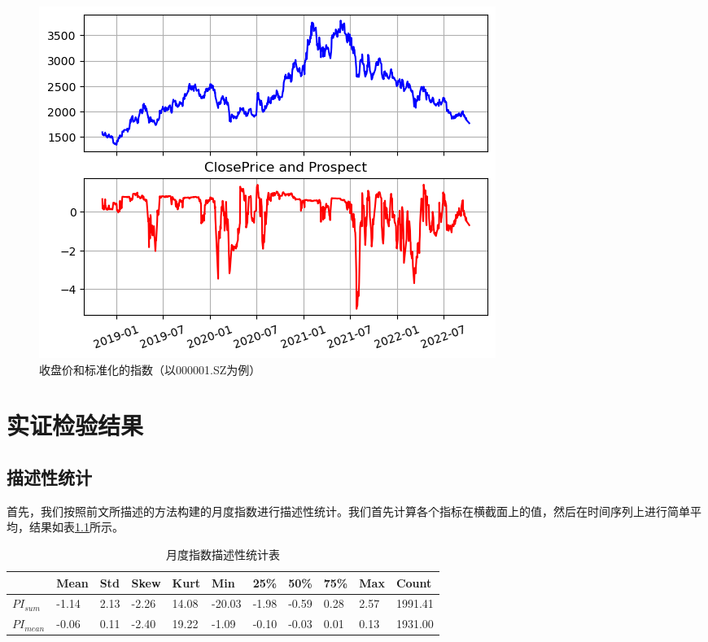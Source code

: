 \documentclass[a4paper,12pt]{report}
\begin{document}
\begin{figure}[htbp]
	\centering
	\includegraphics{figure/prospect_index_000001}
	\caption{收盘价和标准化的指数（以000001.SZ为例）}
	\label{fig:prospect_index_000001}
\end{figure}

\chapter{实证检验结果}
\section{描述性统计}
首先，我们按照前文所描述的方法构建的月度指数进行描述性统计。我们首先计算各个指标在横截面上的值，然后在时间序列上进行简单平均，结果如表\ref{tab: describe}所示。

\begin{table}[htbp]
	\centering
	\caption{月度指数描述性统计表}
	\label{tab: describe}
	\begin{tabular}{@{}lllllllllll@{}}
		\toprule
								 & Mean  & Std  &Skew &	Kurt	& Min    & 25\%  & 50\%  & 75\% & Max  & Count   \\ \midrule
		$PI_{sum}$   & -1.14   & 2.13 &	-2.26&14.08	& -20.03 & -1.98 & -0.59 & 0.28 & 2.57 & 1991.41 \\
		$PI_{mean}$ & -0.06 & 0.11 &  -2.40 &	19.22& -1.09  & -0.10 & -0.03 & 0.01 & 0.13 & 1931.00 \\ \bottomrule
	\end{tabular}
\end{table}
\end{document}
